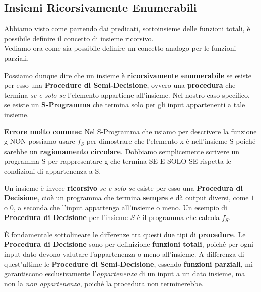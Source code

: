 \subsection{Insiemi Ricorsivamente Enumerabili}

Abbiamo visto come partendo dai predicati, sottoinsieme delle funzioni totali, è possibile definire il concetto di insieme ricorsivo.\\
Vediamo ora come sia possibile definire un concetto analogo per le funzioni parziali.


Possiamo dunque dire che un insieme è \textbf{ricorsivamente enumerabile} se esiste per esso una \textbf{Procedure di Semi-Decisione}, ovvero una \textbf{procedura} che termina \textit{se e solo se} l'elemento appartiene all'insieme.
Nel nostro caso specifico, se esiste un \textbf{S-Programma} che termina solo per gli input appartenenti a tale insieme.

\textbf{Errore molto comune: } Nel S-Programma che usiamo per descrivere la funzione g NON possiamo usare $f_S$ per dimostrare che l'elemento x è nell'insieme S poiché sarebbe un \textbf{ragionamento circolare}. Dobbiamo semplicemente
scrivere un programma-S per rappresentare g che termina SE E SOLO SE rispetta le condizioni di appartenenza a S.

Un insieme è invece \textbf{ricorsivo} \textit{se e solo se} esiste per esso una \textbf{Procedura di Decisione}, cioè un programma che termina \textbf{sempre} e dà output diversi, come \(1\) o \(0\), a seconda che l'input appartenga all'insieme o meno.
Un esempio di \textbf{Procedura di Decisione} per l'insieme \(S\) è il programma che calcola \(f_S\).

È fondamentale sottolineare le differenze tra questi due tipi di \textbf{procedure}. Le \textbf{Procedura di Decisione} sono per definizione \textbf{funzioni totali}, poiché per ogni input dato devono valutare l'appartenenza o meno all'insieme.
A differenza di quest'ultime le \textbf{Procedure di Semi-Decisione}, essendo \textbf{funzioni parziali}, mi garantiscono esclusivamente l'\textit{appartenenza} di un input a un dato insieme, ma non la \textit{non appartenenza}, poiché la procedura non terminerebbe.

